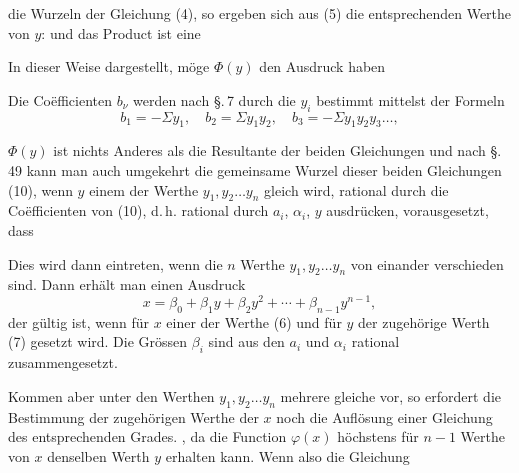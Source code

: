 
die Wurzeln der Gleichung (4), so ergeben sich aus (5) die entsprechenden Werthe von $y$:
und das Product
ist eine 

In dieser Weise dargestellt, möge $\Phi(y)$ den Ausdruck haben

Die Co\"efficienten $b_\nu$ werden nach \S.\,7 durch die $y_i$ bestimmt mittelst der Formeln
\[
b_1 = -\Sigma y_1, \quad b_2 = \Sigma y_1 y_2, \quad b_3 = -\Sigma y_1 y_2 y_3 \ldots,
\]

$\Phi(y)$ ist nichts Anderes als die Resultante der beiden Gleichungen
und nach \S.\,49 kann man auch umgekehrt die gemeinsame Wurzel dieser beiden Gleichungen (10), wenn $y$ einem der Werthe $y_1, y_2 \ldots y_n$ gleich wird, rational durch die Co\"efficienten von (10), d.\,h. rational durch $a_i$, $\alpha_i$, $y$ ausdrücken, vorausgesetzt, dass 

Dies wird dann eintreten, wenn die $n$ Werthe $y_1, y_2 \ldots y_n$ von einander verschieden sind. Dann erhält man einen Ausdruck
\[
x = \beta_0 + \beta_1 y + \beta_2 y^2 + \cdots + \beta_{n-1} y^{n-1},
\]
der gültig ist, wenn für $x$ einer der Werthe (6) und für $y$ der zugehörige Werth (7) gesetzt wird. Die Grössen $\beta_i$ sind aus den $a_i$ und $\alpha_i$ rational zusammengesetzt.

Kommen aber unter den Werthen $y_1, y_2 \ldots y_n$ mehrere gleiche vor, so erfordert die Bestimmung der zugehörigen Werthe der $x$ noch die Auflösung einer Gleichung des entsprechenden Grades. , da die Function $\varphi(x)$ höchstens für $n-1$ Werthe von $x$ denselben Werth $y$ erhalten kann. Wenn also die Gleichung
